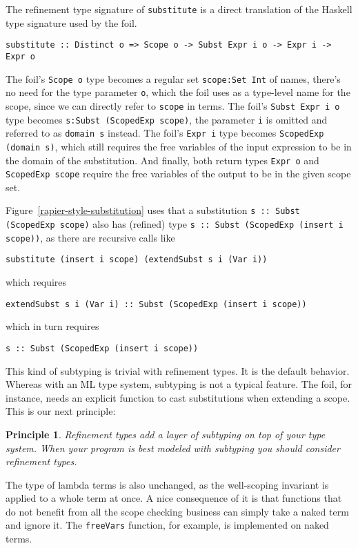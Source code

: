 \documentclass[sigconf, review]{acmart}
\newcommand{\tc}[1]{{\small\texttt{#1}}}
\newtheorem{principle}{Principle}
\begin{document}
The refinement type signature of \tc{substitute} is a direct translation of the
Haskell type signature used by the foil.
\begin{verbatim}
substitute :: Distinct o => Scope o -> Subst Expr i o -> Expr i -> Expr o
\end{verbatim}
The foil's \tc{Scope o} type becomes a
regular set \tc{scope:Set Int} of names, there's no need for the type parameter
\tc{o}, which the foil uses as a type-level name for the scope, since we can directly refer to \tc{scope} in terms. The foil's \tc{Subst Expr i o} type
becomes \tc{s:Subst (ScopedExp scope)}, the parameter \tc{i} is omitted and
referred to as \tc{domain s} instead. The foil's \tc{Expr i} type becomes
\tc{ScopedExp (domain s)}, which still requires the free variables of the input
expression to be in the domain of the substitution. And finally, both return types
\tc{Expr o} and \tc{ScopedExp scope} require the free variables of the output to
be in the given scope set.

Figure~\ref{rapier-style-substitution} uses that a substitution
\tc{s :: Subst (ScopedExp scope)}
also has (refined) type
\tc{s :: Subst (ScopedExp (insert i scope))},
as there are recursive calls like
\begin{verbatim}
substitute (insert i scope) (extendSubst s i (Var i))
\end{verbatim}
which requires
\begin{verbatim}
extendSubst s i (Var i) :: Subst (ScopedExp (insert i scope))
\end{verbatim}
which in turn requires
\begin{verbatim}
s :: Subst (ScopedExp (insert i scope))
\end{verbatim}
This kind of subtyping is trivial with refinement types. It is the default
behavior. Whereas with an ML type system, subtyping is not a typical feature. The
foil, for instance, needs an explicit function to cast substitutions when
extending a scope. This is our next principle:
\begin{principle}
  Refinement types add a layer of subtyping on top of your type system. When
  your program is best modeled with subtyping you should consider refinement
  types.
\end{principle}

The type of lambda terms is also unchanged, as the well-scoping invariant is
applied to a whole term at once. A nice consequence of it is that functions
that do not benefit from all the scope checking business can simply take a naked
term and ignore it. The \tc{freeVars} function, for example, is implemented on
naked terms.
\end{document}
